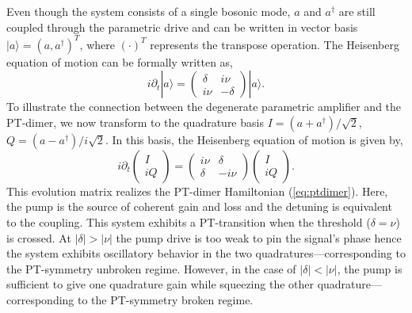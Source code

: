\documentclass[prl,twocolumn,english,superscriptaddress,floatfix,longbibliography]{revtex4-2}
\newcommand{\ket}[1]{|#1\rangle}
\begin{document}
 Even though the system consists of a single bosonic mode, $a$ and $a^{\dagger}$ are still coupled through the parametric drive and can be written in vector basis $\ket{a} = (a,a^{\dagger})^{T}$, where $(\cdot)^T$ represents the transpose operation.  The Heisenberg equation of motion can be formally written as,%
\begin{equation}
    i \partial _{t} \ket{a} = \begin{pmatrix} \delta & i\nu \\ i \nu & -\delta \end{pmatrix}\ket{a}.
\end{equation}
To illustrate the connection between the degenerate parametric amplifier and the PT-dimer,  we now transform to the quadrature basis $I =( a + a^\dagger)/\sqrt{2}$, $Q = (a - a^\dagger)/i\sqrt{2}$. %
In this basis, the Heisenberg equation of motion is given by,
\begin{equation}
    i \partial _{t} \begin{pmatrix} I\\i Q\end{pmatrix} = \begin{pmatrix} i \nu & \delta \\ \delta & -i \nu \end{pmatrix} \begin{pmatrix} I\\iQ \end{pmatrix}. \label{eq:iqeom}
\end{equation}
This evolution matrix realizes the PT-dimer Hamiltonian  (\ref{eq:ptdimer}). Here, the pump is the source of coherent gain and loss and the detuning is equivalent to the  coupling. This system exhibits a PT-transition when the threshold ($\delta = \nu$) is crossed. At $|\delta|>|\nu|$ the pump drive is too weak to pin the signal's phase hence the system exhibits oscillatory behavior in the two quadratures---corresponding to the PT-symmetry unbroken regime. However, in the case of $|\delta|<|\nu|$, the pump is sufficient to give one quadrature gain while squeezing the other quadrature---corresponding to the PT-symmetry broken regime. 
\end{document}

